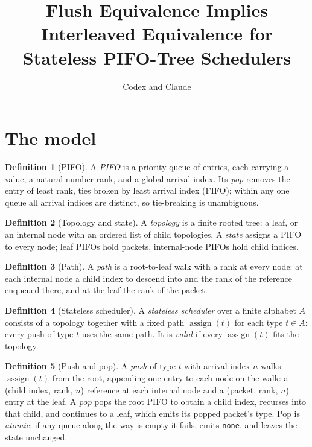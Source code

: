 \documentclass{amsart}
\title{Flush Equivalence Implies Interleaved Equivalence for Stateless PIFO-Tree Schedulers}
\author{Codex and Claude}
\date{}
\theoremstyle{plain}
\theoremstyle{definition}
\newtheorem{definition}{Definition}
\begin{document}
\maketitle

\section{The model}

\begin{definition}[PIFO]
A \emph{PIFO} is a priority queue of entries, each carrying a value, a natural-number rank, and a
global arrival index. Its \emph{pop} removes the entry of least rank, ties broken by least arrival
index (FIFO); within any one queue all arrival indices are distinct, so tie-breaking is unambiguous.
\end{definition}

\begin{definition}[Topology and state]
A \emph{topology} is a finite rooted tree: a leaf, or an internal node with an ordered list of child
topologies. A \emph{state} assigns a PIFO to every node; leaf PIFOs hold packets, internal-node PIFOs
hold child indices.
\end{definition}

\begin{definition}[Path]
A \emph{path} is a root-to-leaf walk with a rank at every node: at each internal node a child index to
descend into and the rank of the reference enqueued there, and at the leaf the rank of the packet.
\end{definition}

\begin{definition}[Stateless scheduler]
A \emph{stateless scheduler} over a finite alphabet $A$ consists of a topology together with a fixed
path $\operatorname{assign}(t)$ for each type $t\in A$: every push of type $t$ uses the same path. It
is \emph{valid} if every $\operatorname{assign}(t)$ fits the topology.
\end{definition}

\begin{definition}[Push and pop]
A \emph{push} of type $t$ with arrival index $n$ walks $\operatorname{assign}(t)$ from the root,
appending one entry to each node on the walk: a (child index, rank, $n$) reference at each internal
node and a (packet, rank, $n$) entry at the leaf. A \emph{pop} pops the root PIFO to obtain a child
index, recurses into that child, and continues to a leaf, which emits its popped packet's type. Pop is
\emph{atomic}: if any queue along the way is empty it fails, emits \texttt{none}, and leaves the state
unchanged.
\end{definition}
\end{document}
